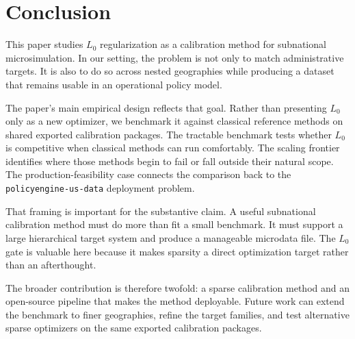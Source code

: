 \section{Conclusion}
\label{sec:conclusion}

This paper studies $L_0$ regularization as a calibration method for subnational microsimulation. In
our setting, the problem is not only to match administrative targets. It is also to do so across
nested geographies while producing a dataset that remains usable in an operational policy model.

The paper's main empirical design reflects that goal. Rather than presenting $L_0$ only as a new
optimizer, we benchmark it against classical reference methods on shared exported calibration
packages. The tractable benchmark tests whether $L_0$ is competitive when classical methods can run
comfortably. The scaling frontier identifies where those methods begin to fail or fall outside
their natural scope. The production-feasibility case connects the comparison back to the
\texttt{policyengine-us-data} deployment problem.

That framing is important for the substantive claim. A useful subnational calibration method must
do more than fit a small benchmark. It must support a large hierarchical target system and produce a
manageable microdata file. The $L_0$ gate is valuable here because it makes sparsity a direct
optimization target rather than an afterthought.

The broader contribution is therefore twofold: a sparse calibration method and an open-source
pipeline that makes the method deployable. Future work can extend the benchmark to finer
geographies, refine the target families, and test alternative sparse optimizers on the same
exported calibration packages.
